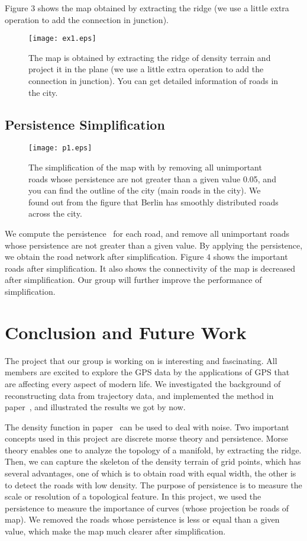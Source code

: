 \documentclass[11pt]{article}
\begin{document}
Figure $3$ shows the map obtained by extracting the ridge (we use a little extra operation to add the connection in junction).
 \begin{figure}[H]
  \caption{The map is obtained by extracting the ridge of density terrain and project it in the plane (we use a little extra operation to add the connection in junction). You can get detailed information of roads in the city.}
  \centering 
 \texttt{[image: ex1.eps]} 
\end{figure}

\subsection*{Persistence Simplification}
\begin{figure}[h!]
  \caption{The simplification of the map with by removing all unimportant roads whose persistence are not greater than a given value 0.05, and you can find the outline of the city (main roads in the city). We found out from the figure that Berlin has smoothly distributed roads across the city.} 
  \centering
 \texttt{[image: p1.eps]} 
\end{figure}
We compute the persistence~\cite{edelsbrunner2008persistent} for each road, and remove all unimportant roads whose persistence are not greater than a given value. By applying the persistence, we obtain the  road network after simplification. Figure $4$ shows the important roads after simplification. It also shows the connectivity of the map is decreased after simplification. Our group will further improve the performance of simplification.
\section*{Conclusion and Future Work}
\par
The project that our group is working on is interesting and fascinating. All members are excited to explore the GPS data by the applications of GPS that are affecting every aspect of modern life.    We investigated the background of reconstructing data from trajectory data, and implemented  the method in paper~\cite{Wang15}, and illustrated the results we got by now.


The  density function in paper~\cite{Wang15} can be used to deal with noise.
Two important concepts used in this project are discrete morse theory and persistence.  Morse theory enables one to analyze the topology of a manifold, by extracting the ridge. Then, we can capture the skeleton of the density terrain of grid points, which has several advantages, one of which is to obtain road with equal width, the other is to detect the roads with low density.   The  purpose of persistence is to measure  the scale or
resolution of a topological feature. In this project, we used the persistence to measure the importance of curves (whose projection be roads of map). We removed the roads whose persistence is less or equal than a given value, which make the map much clearer after simplification.    
\end{document}
